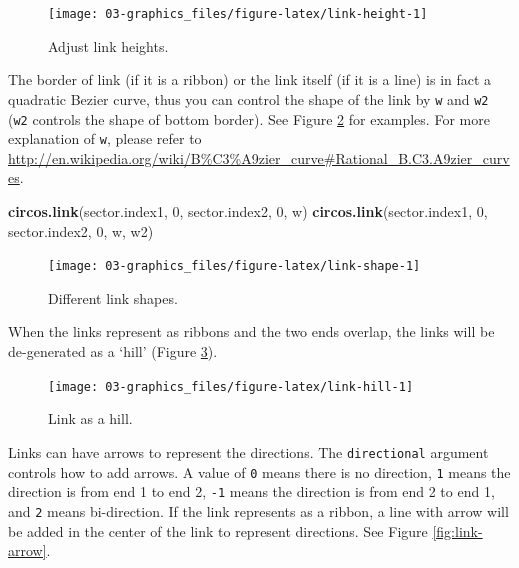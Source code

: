\documentclass[]{book}
\newenvironment{Shaded}{\begin{snugshade}}{\end{snugshade}}
\newcommand{\KeywordTok}[1]{\textcolor[rgb]{0.13,0.29,0.53}{\textbf{#1}}}
\newcommand{\DecValTok}[1]{\textcolor[rgb]{0.00,0.00,0.81}{#1}}
\newcommand{\NormalTok}[1]{#1}
\theoremstyle{definition}
\theoremstyle{definition}
\theoremstyle{remark}
\begin{document}
\begin{figure}

{\centering \texttt{[image: 03-graphics\_files/figure-latex/link-height-1]} 

}

\caption{Adjust link heights.}\label{fig:link-height}
\end{figure}

The border of link (if it is a ribbon) or the link itself (if it is a
line) is in fact a quadratic Bezier curve, thus you can control the
shape of the link by \texttt{w} and \texttt{w2} (\texttt{w2} controls
the shape of bottom border). See Figure \ref{fig:link-shape} for
examples. For more explanation of \texttt{w}, please refer to
\url{http://en.wikipedia.org/wiki/B\%C3\%A9zier_curve\#Rational_B.C3.A9zier_curves}.

\begin{Shaded}
\begin{Highlighting}[]
\KeywordTok{circos.link}\NormalTok{(sector.index1, }\DecValTok{0}\NormalTok{, sector.index2, }\DecValTok{0}\NormalTok{, w)}
\KeywordTok{circos.link}\NormalTok{(sector.index1, }\DecValTok{0}\NormalTok{, sector.index2, }\DecValTok{0}\NormalTok{, w, w2)}
\end{Highlighting}
\end{Shaded}

\begin{figure}

{\centering \texttt{[image: 03-graphics\_files/figure-latex/link-shape-1]} 

}

\caption{Different link shapes.}\label{fig:link-shape}
\end{figure}

When the links represent as ribbons and the two ends overlap, the links
will be de-generated as a `hill' (Figure \ref{fig:link-hill}).

\begin{figure}

{\centering \texttt{[image: 03-graphics\_files/figure-latex/link-hill-1]} 

}

\caption{Link as a hill.}\label{fig:link-hill}
\end{figure}

Links can have arrows to represent the directions. The
\texttt{directional} argument controls how to add arrows. A value of
\texttt{0} means there is no direction, \texttt{1} means the direction
is from end 1 to end 2, \texttt{-1} means the direction is from end 2 to
end 1, and \texttt{2} means bi-direction. If the link represents as a
ribbon, a line with arrow will be added in the center of the link to
represent directions. See Figure \ref{fig:link-arrow}.
\end{document}
